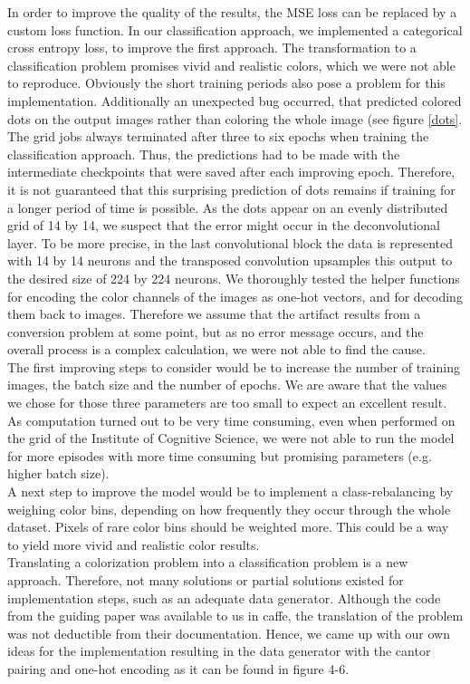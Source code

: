 \documentclass[12pt,letterpaper]{article}
\begin{document}
In order to improve the quality of the results, the MSE loss can be replaced by a custom loss function. In our classification approach, we implemented a categorical cross entropy loss, to improve the first approach. The transformation to a classification problem promises vivid and realistic colors, which we were not able to reproduce. Obviously the short training periods also pose a problem for this implementation. Additionally an unexpected bug occurred, that predicted colored dots on the output images rather than coloring the whole image (see figure \ref{dots}. The grid jobs always terminated after three to six epochs when training the classification approach. Thus, the predictions had to be made with the intermediate checkpoints that were saved after each improving epoch. Therefore, it is not guaranteed that this surprising prediction of dots remains if training for a longer period of time is possible. As the dots appear on an evenly distributed grid of 14 by 14, we suspect that the error might occur in the deconvolutional layer. To be more precise, in the last convolutional block the data is represented with 14 by 14 neurons and the transposed convolution upsamples this output to the desired size of 224 by 224 neurons. We thoroughly tested the helper functions for encoding the color channels of the images as one-hot vectors, and for decoding them back to images. Therefore we assume that the artifact results from a conversion problem at some point, but as no error message occurs, and the overall process is a complex calculation, we were not able to find the cause.\\
The first improving steps to consider would be to increase the number of training images, the batch size and the number of epochs. We are aware that the values we chose for those three parameters are too small to expect an excellent result. As computation turned out to be very time consuming, even when performed on the grid of the Institute of Cognitive Science, we were not able to run the model for more episodes with more time consuming but promising parameters (e.g. higher batch size).\\
A next step to improve the model would be to implement a class-rebalancing by weighing color bins, depending on how frequently they occur through the whole dataset. Pixels of rare color bins should be weighted more. This could be a way to yield more vivid and realistic color results.\\
Translating a colorization problem into a classification problem is a new approach. Therefore, not many solutions or partial solutions existed for implementation steps, such as an adequate data generator. Although the code from the guiding paper was available to us in caffe, the translation of the problem was not deductible from their documentation. Hence, we came up with our own ideas for the implementation resulting in the data generator with the cantor pairing and one-hot encoding as it can be found in figure 4-6.\\
\end{document}

